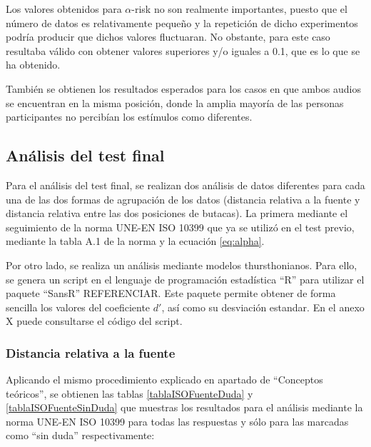 \documentclass[11pt,a4paper,twoside]{book}
\begin{document}
		Los valores obtenidos para $\alpha$-risk no son realmente importantes, puesto que el número de datos es relativamente pequeño y la repetición de dicho experimentos podría producir que dichos valores fluctuaran. No obstante, para este caso resultaba válido con obtener valores superiores y/o iguales a 0.1, que es lo que se ha obtenido.
		
		También se obtienen los resultados esperados para los casos en que ambos audios se encuentran en la misma posición, donde la amplia mayoría de las personas participantes no percibían los estímulos como diferentes.\newpage
		
    \subsection{Análisis del test final}
        Para el análisis del test final, se realizan dos análisis de datos diferentes para cada una de las dos formas de agrupación de los datos (distancia relativa a la fuente y distancia relativa entre las dos posiciones de butacas). La primera mediante el seguimiento de la norma UNE-EN ISO 10399 que ya se utilizó en el test previo, mediante la tabla A.1 de la norma y la ecuación \ref{eq:alpha}.
        
        Por otro lado, se realiza un análisis mediante modelos thursthonianos. Para ello, se genera un script en el lenguaje de programación estadística ``R'' para utilizar el paquete ``SansR'' REFERENCIAR. Este paquete permite obtener de forma sencilla los valores del coeficiente $d'$, así como su desviación estandar. En el anexo X puede consultarse el código del script.
        
        
		\subsubsection*{Distancia relativa a la fuente}
		    Aplicando el mismo procedimiento explicado en apartado de ``Conceptos teóricos'', se obtienen las tablas \ref{tablaISOFuenteDuda} y \ref{tablaISOFuenteSinDuda} que muestras los resultados para el análisis mediante la norma UNE-EN ISO 10399 para todas las respuestas y sólo para las marcadas como ``sin duda'' respectivamente:
		    
\end{document}
